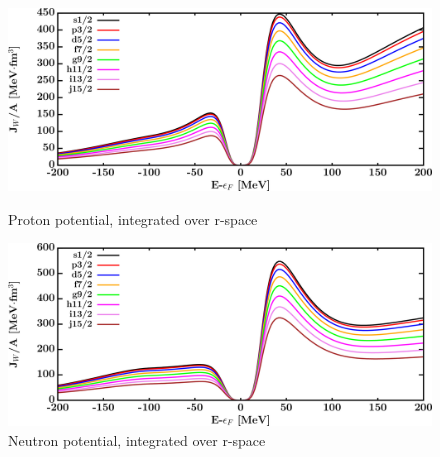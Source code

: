 \begin{figure}[H]
    \centering
    \begin{minipage}{0.45\textwidth}
        \centering
        \includegraphics[width=1.0\textwidth]{figures/ca48_protonVolumeIntegrals.png}
        \caption{Proton potential, integrated over r-space}
        \label{DOMFitData_ca48_proton_potentialIntegral}
    \end{minipage}\hfill
    \begin{minipage}{0.45\textwidth}
        \centering
        \includegraphics[width=1.0\textwidth]{figures/ca48_neutronVolumeIntegrals.png}
        \caption{Neutron potential, integrated over r-space}
        \label{DOMFitData_ca48_neutron_potentialIntegral}
    \end{minipage}
\end{figure}

\afterpage{\clearpage}

